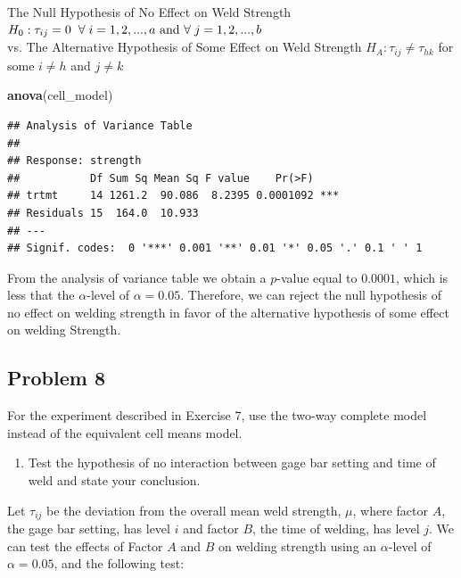 \documentclass[12pt,]{article}
\newenvironment{Shaded}{\begin{snugshade}}{\end{snugshade}}
\newcommand{\KeywordTok}[1]{\textcolor[rgb]{0.13,0.29,0.53}{\textbf{#1}}}
\newcommand{\NormalTok}[1]{#1}
\providecommand{\tightlist}{%
  \setlength{\itemsep}{0pt}\setlength{\parskip}{0pt}}
\begin{document}
\begin{center}
 The Null Hypothesis of No Effect on Weld Strength  
 $H_0 : \tau_{ij} = 0 \hspace{.2cm }\forall \hspace{.1cm} i=1,2,...,a \text{ and }\forall  \hspace{.1cm} j=1,2,...,b$ \\
 vs. The Alternative Hypothesis of Some Effect on Weld Strength $H_A : \tau_{ij} \neq \tau_{hk}$ for some $i\neq h$ and $j\neq k$ 
\end{center}

\begin{Shaded}
\begin{Highlighting}[]
\KeywordTok{anova}\NormalTok{(cell_model)}
\end{Highlighting}
\end{Shaded}

\begin{verbatim}
## Analysis of Variance Table
## 
## Response: strength
##           Df Sum Sq Mean Sq F value    Pr(>F)    
## trtmt     14 1261.2  90.086  8.2395 0.0001092 ***
## Residuals 15  164.0  10.933                      
## ---
## Signif. codes:  0 '***' 0.001 '**' 0.01 '*' 0.05 '.' 0.1 ' ' 1
\end{verbatim}

From the analysis of variance table we obtain a \(p\)-value equal to
\(0.0001\), which is less that the \(\alpha\)-level of
\(\alpha = 0.05\). Therefore, we can reject the null hypothesis of no
effect on welding strength in favor of the alternative hypothesis of
some effect on welding Strength.

\subsection{Problem 8}\label{problem-8}

For the experiment described in Exercise 7, use the two-way complete
model instead of the equivalent cell means model.

\begin{enumerate}
\def\labelenumi{(\alph{enumi})}
\tightlist
\item
  Test the hypothesis of no interaction between gage bar setting and
  time of weld and state your conclusion.
\end{enumerate}

Let \(\tau_{ij}\) be the deviation from the overall mean weld strength,
\(\mu\), where factor \(A\), the gage bar setting, has level \(i\) and
factor \(B\), the time of welding, has level \(j\). We can test the
effects of Factor \(A\) and \(B\) on welding strength using an
\(\alpha\)-level of \(\alpha = 0.05\), and the following test:
\end{document}
